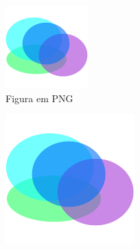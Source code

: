     \begin{figure}
        \centering
        \begin{subfigure}[t]{0.3\textwidth}
            \centering
            \includegraphics[width=\textwidth]{images/figure.png}
            \caption{Figura em PNG}
            \label{subfig:png}
        \end{subfigure}
        \hfill
        \begin{subfigure}[t]{0.3\textwidth}
            \centering
            \includegraphics[width=\textwidth]{images/figure.pdf}

\end{subfigure}
\end{figure}
